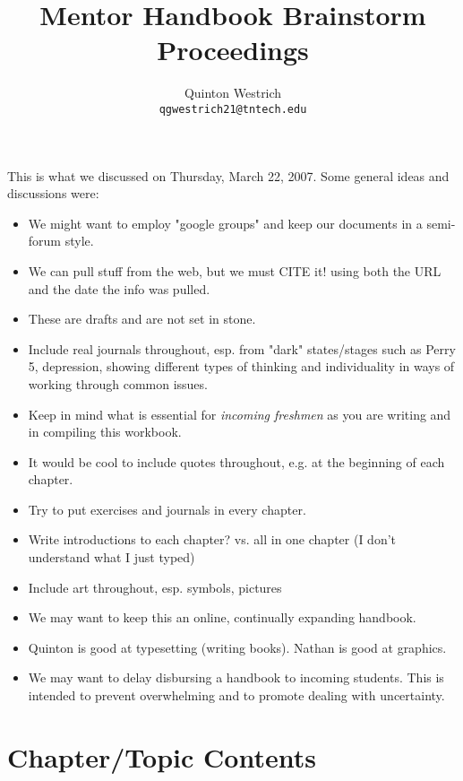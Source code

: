 \documentclass[12pt]{article}
\title{Mentor Handbook Brainstorm Proceedings}
\author{Quinton Westrich \\ {\normalsize \texttt{qgwestrich21@tntech.edu}}}
\begin{document}
\maketitle
This is what we discussed on Thursday, March 22, 2007. Some general ideas and discussions were:
\begin{itemize}
	\item We might want to employ "google groups" and keep our documents in a semi-forum style.
	\item We can pull stuff from the web, but we must CITE it! using both the URL and the date the info was pulled.
	\item These are drafts and are not set in stone.
	\item Include real journals throughout, esp. from "dark" states/stages such as Perry 5, depression, showing different types of thinking and individuality in ways of working through common issues.
	\item Keep in mind what is essential for \emph{incoming freshmen} as you are writing and in compiling this workbook.
	\item It would be cool to include quotes throughout, e.g. at the beginning of each chapter.
	\item Try to put exercises and journals in every chapter.
	\item Write introductions to each chapter? vs. all in one chapter (I don't understand what I just typed)
	\item Include art throughout, esp. symbols, pictures
	\item We may want to keep this an online, continually expanding handbook.
	\item Quinton is good at typesetting (writing books). Nathan is good at graphics.
	\item We may want to delay disbursing a handbook to incoming students. This is intended to prevent overwhelming and to promote dealing with uncertainty.
\end{itemize}


\section{Chapter/Topic Contents}
\end{document}
